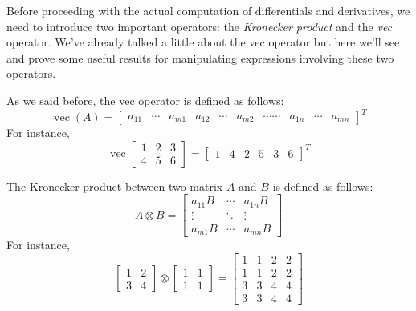 \documentclass[a4paper,12pt]{article}
\begin{document}
Before proceeding with the actual computation of differentials and derivatives, we need to introduce two important operators: the \emph{Kronecker product} and the \emph{vec} operator. We've already talked a little about the vec operator but here we'll see and prove some useful results for manipulating expressions involving these two operators.

As we said before, the vec operator is defined as follows:
$$
\operatorname{vec}(A) =
\begin{bmatrix}
a_{11} & \cdots & a_{m1} & a_{12} & \cdots & a_{m2} & \cdots\cdots & a_{1n} & \cdots & a_{mn}
\end{bmatrix}^T
$$ For instance,
$$
\operatorname{vec}\begin{bmatrix}
1 & 2 & 3 \\
4 & 5 & 6
\end{bmatrix}
=
\begin{bmatrix}
1&4&2&5&3&6
\end{bmatrix}^T
$$

The Kronecker product between two matrix $A$ and $B$ is defined as follows:
$$
A\otimes B =
\begin{bmatrix}
a_{11}B & \cdots & a_{1n}B \\
\vdots & \ddots & \vdots \\
a_{m1}B & \cdots & a_{mn}B
\end{bmatrix}
$$ For instance,
$$
\begin{bmatrix}
1 & 2 \\
3 & 4
\end{bmatrix}
\otimes
\begin{bmatrix}
1 & 1 \\
1 & 1
\end{bmatrix}
=
\begin{bmatrix}
1 & 1 & 2 & 2 \\
1 & 1 & 2 & 2 \\
3 & 3 & 4 & 4 \\
3 & 3 & 4 & 4
\end{bmatrix}
$$
\end{document}
